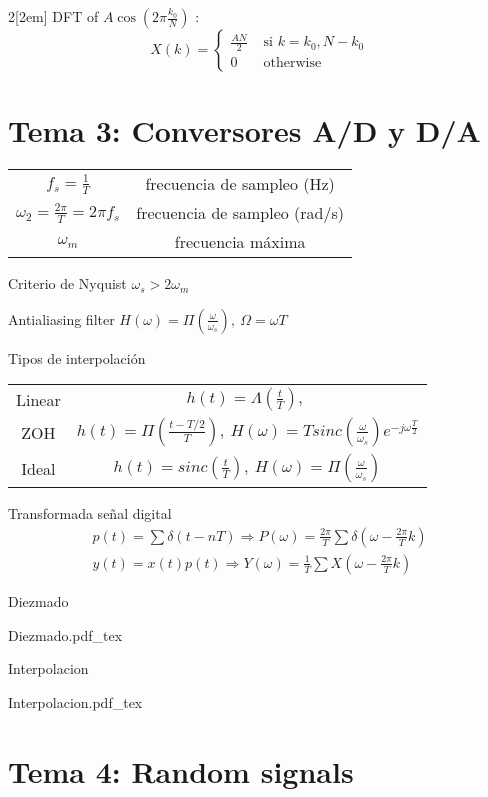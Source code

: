\documentclass{myclass}
\newcommand{\incfig}[1]{%
{\center
\def\svgwidth{0.9\columnwidth}
{#1.pdf_tex}
\par}
}
\begin{document}
\begin{multicols}{2}[\columnsep2em]
DFT of $A\cos(2\pi \frac{k_0}{N})$ :
\[
  X(k) = 
\begin{cases}
  \frac{AN}{2} &\text{ si } k = k_0, N-k_0 \\
  0 &\text{ otherwise}
\end{cases}
\] 

\section{Tema 3: Conversores A/D y D/A }
\begin{center}
\begin{tabular}{cc}
  $f_s=\frac{1}{T}$ & frecuencia de sampleo (Hz)\\
  $\omega _2 = \frac{2\pi}{T}=2\pi f_s$ & frecuencia de sampleo (rad/s)\\
  $\omega _m$ & frecuencia máxima
\end{tabular}
\end{center}

Criterio de Nyquist $\omega_s>2\omega _m$

Antialiasing filter $H(\omega )=\Pi(\frac{\omega }{\omega _s}), \ \Omega  = \omega T$

Tipos de interpolación
\begin{center}
\begin{tabular}{cc}
  Linear & $h(t)=\Lambda(\frac{t}{T}), \ $ \\
  ZOH & $h(t)=\Pi(\frac{t-T /2}{T}), \ H(\omega ) = Tsinc( \frac{\omega}{\omega _s})e^{-j\omega \frac{T}{2}}$\\
  Ideal & $h(t)=sinc\left(\frac{t}{T}\right), \ H(\omega )=\Pi (\frac{\omega }{\omega _s})$
\end{tabular}
\end{center}

Transformada señal digital
\begin{align*}
  p(t) = \sum \delta(t-nT) \Rightarrow P(\omega ) = \frac{2\pi}{T}\sum \delta (\omega -\frac{2\pi}{T}k) \\
  y(t)=x(t)p(t) \Rightarrow Y(\omega ) = \frac{1}{T}\sum X(\omega -\frac{2\pi}{T}k)
\end{align*}

Diezmado
\incfig{Diezmado}

Interpolacion
\incfig{Interpolacion}

\section{Tema 4: Random signals}


\end{multicols}
\end{document}
